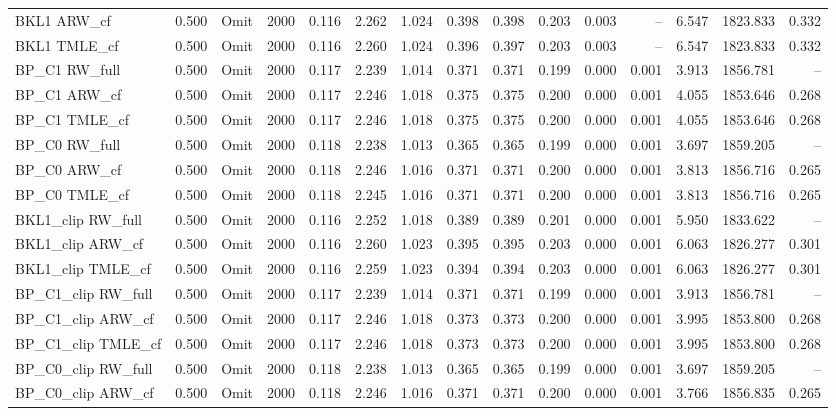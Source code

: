 \begin{tabular}{llllrrrrrrrrrrr}
BKL1 ARW\_cf & 0.500 & Omit & 2000 & 0.116 & 2.262 & 1.024 & 0.398 & 0.398 & 0.203 & 0.003 & -- & 6.547 & 1823.833 & 0.332 \\
BKL1 TMLE\_cf & 0.500 & Omit & 2000 & 0.116 & 2.260 & 1.024 & 0.396 & 0.397 & 0.203 & 0.003 & -- & 6.547 & 1823.833 & 0.332 \\
BP\_C1 RW\_full & 0.500 & Omit & 2000 & 0.117 & 2.239 & 1.014 & 0.371 & 0.371 & 0.199 & 0.000 & 0.001 & 3.913 & 1856.781 & -- \\
BP\_C1 ARW\_cf & 0.500 & Omit & 2000 & 0.117 & 2.246 & 1.018 & 0.375 & 0.375 & 0.200 & 0.000 & 0.001 & 4.055 & 1853.646 & 0.268 \\
BP\_C1 TMLE\_cf & 0.500 & Omit & 2000 & 0.117 & 2.246 & 1.018 & 0.375 & 0.375 & 0.200 & 0.000 & 0.001 & 4.055 & 1853.646 & 0.268 \\
BP\_C0 RW\_full & 0.500 & Omit & 2000 & 0.118 & 2.238 & 1.013 & 0.365 & 0.365 & 0.199 & 0.000 & 0.001 & 3.697 & 1859.205 & -- \\
BP\_C0 ARW\_cf & 0.500 & Omit & 2000 & 0.118 & 2.246 & 1.016 & 0.371 & 0.371 & 0.200 & 0.000 & 0.001 & 3.813 & 1856.716 & 0.265 \\
BP\_C0 TMLE\_cf & 0.500 & Omit & 2000 & 0.118 & 2.245 & 1.016 & 0.371 & 0.371 & 0.200 & 0.000 & 0.001 & 3.813 & 1856.716 & 0.265 \\
BKL1\_clip RW\_full & 0.500 & Omit & 2000 & 0.116 & 2.252 & 1.018 & 0.389 & 0.389 & 0.201 & 0.000 & 0.001 & 5.950 & 1833.622 & -- \\
BKL1\_clip ARW\_cf & 0.500 & Omit & 2000 & 0.116 & 2.260 & 1.023 & 0.395 & 0.395 & 0.203 & 0.000 & 0.001 & 6.063 & 1826.277 & 0.301 \\
BKL1\_clip TMLE\_cf & 0.500 & Omit & 2000 & 0.116 & 2.259 & 1.023 & 0.394 & 0.394 & 0.203 & 0.000 & 0.001 & 6.063 & 1826.277 & 0.301 \\
BP\_C1\_clip RW\_full & 0.500 & Omit & 2000 & 0.117 & 2.239 & 1.014 & 0.371 & 0.371 & 0.199 & 0.000 & 0.001 & 3.913 & 1856.781 & -- \\
BP\_C1\_clip ARW\_cf & 0.500 & Omit & 2000 & 0.117 & 2.246 & 1.018 & 0.373 & 0.373 & 0.200 & 0.000 & 0.001 & 3.995 & 1853.800 & 0.268 \\
BP\_C1\_clip TMLE\_cf & 0.500 & Omit & 2000 & 0.117 & 2.246 & 1.018 & 0.373 & 0.373 & 0.200 & 0.000 & 0.001 & 3.995 & 1853.800 & 0.268 \\
BP\_C0\_clip RW\_full & 0.500 & Omit & 2000 & 0.118 & 2.238 & 1.013 & 0.365 & 0.365 & 0.199 & 0.000 & 0.001 & 3.697 & 1859.205 & -- \\
BP\_C0\_clip ARW\_cf & 0.500 & Omit & 2000 & 0.118 & 2.246 & 1.016 & 0.371 & 0.371 & 0.200 & 0.000 & 0.001 & 3.766 & 1856.835 & 0.265 \\

\end{tabular}
